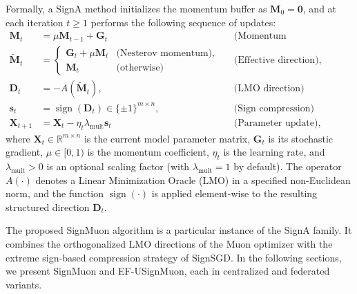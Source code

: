 \documentclass{article}
\begin{document}
Formally, a SignA method initializes the momentum buffer as $\mathbf{M}_0 = \mathbf{0}$, and at each iteration $t \ge 1$ performs the following sequence of updates:
\begin{equation}
\begin{aligned}
\mathbf{M}_t &= \mu \mathbf{M}_{t-1} + \mathbf{G}_t && \text{(Momentum accumulation)}\\
\tilde{\mathbf{M}}_t &= 
\begin{cases} 
    \mathbf{G}_t + \mu \mathbf{M}_t & \text{(Nesterov momentum)}, \\
    \mathbf{M}_t & \text{(otherwise)}
\end{cases} && \text{(Effective direction)}, \\
\mathbf{D}_t &= -A(\tilde{\mathbf{M}}_t), && \text{(LMO direction)} \\
\mathbf{s}_t &= \operatorname{sign}(\mathbf{D}_t) \in \{\pm 1\}^{m \times n},  && \text{(Sign compression)}\\
\mathbf{X}_{t+1} &= \mathbf{X}_t - \eta_t \lambda_{\mathrm{mult}} \mathbf{s}_t && \text{(Parameter update)},
\end{aligned}
\label{eq:signa_general}
\end{equation}
where $\mathbf{X}_t \in \mathbb{R}^{m \times n}$ is the current model parameter matrix, $\mathbf{G}_t$ is its stochastic gradient, $\mu \in [0, 1)$ is the momentum coefficient, $\eta_t$ is the learning rate, and $\lambda_{\mathrm{mult}} > 0$ is an optional scaling factor (with $\lambda_{\mathrm{mult}}=1$ by default). The operator $A(\cdot)$ denotes a Linear Minimization Oracle (LMO) in a specified non-Euclidean norm, and the function $\operatorname{sign}(\cdot)$ is applied element-wise to the resulting structured direction $\mathbf{D}_t$.

The proposed SignMuon algorithm is a particular instance of the SignA family. It combines the orthogonalized LMO directions of the Muon optimizer with the extreme sign-based compression strategy of SignSGD. In the following sections, we present SignMuon and EF-USignMuon, each in centralized and federated variants.
\end{document}
